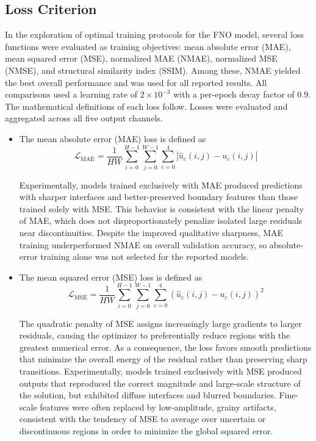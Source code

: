 \documentclass[preprint,review,12pt,numafflabel]{elsarticle}
\begin{document}
\subsection{Loss Criterion}
In the exploration of optimal training protocols for the FNO model, several loss functions were evaluated as training objectives: mean absolute error (MAE), mean squared error (MSE), normalized MAE (NMAE), normalized MSE (NMSE), and structural similarity index (SSIM). Among these, NMAE yielded the best overall performance and was used for all reported results. All comparisons used a learning rate of $2\times10^{-3}$ with a per-epoch decay factor of $0.9$. The mathematical definitions of each loss follow. Losses were evaluated and aggregated across all five output channels. 

\begin{itemize}
    \item The mean absolute error (MAE) loss is defined as
\begin{equation*}
    \mathcal{L}_{\text{MAE}} = \frac{1}{HW} \sum_{i=0}^{H-1} \sum_{j=0}^{W-1} \sum_{c=0}^{4} \left| \hat{u}_{c}(i,j) - u_{c}(i,j) \right|
\end{equation*}

Experimentally, models trained exclusively with MAE produced predictions with sharper interfaces and better-preserved boundary features than those trained solely with MSE. This behavior is consistent with the linear penalty of MAE, which does not disproportionately penalize isolated large residuals near discontinuities. Despite the improved qualitative sharpness, MAE training underperformed NMAE on overall validation accuracy, so absolute-error training alone was not selected for the reported models.

\item The mean squared error (MSE) loss is defined as
\begin{equation*}
    \mathcal{L}_{\text{MSE}} = \frac{1}{HW} \sum_{i=0}^{H-1} \sum_{j=0}^{W-1} \sum_{c=0}^{4} \left( \hat{u}_{c}(i,j) - u_{c}(i,j) \right)^2
\end{equation*}

The quadratic penalty of MSE assigns increasingly large gradients to larger residuals, causing the optimizer to preferentially reduce regions with the greatest numerical error. As a consequence, the loss favors smooth predictions that minimize the overall energy of the residual rather than preserving sharp transitions. Experimentally, models trained exclusively with MSE produced outputs that reproduced the correct magnitude and large-scale structure of the solution, but exhibited diffuse interfaces and blurred boundaries. Fine-scale features were often replaced by low-amplitude, grainy artifacts, consistent with the tendency of MSE to average over uncertain or discontinuous regions in order to minimize the global squared error.


\end{itemize}
\end{document}
